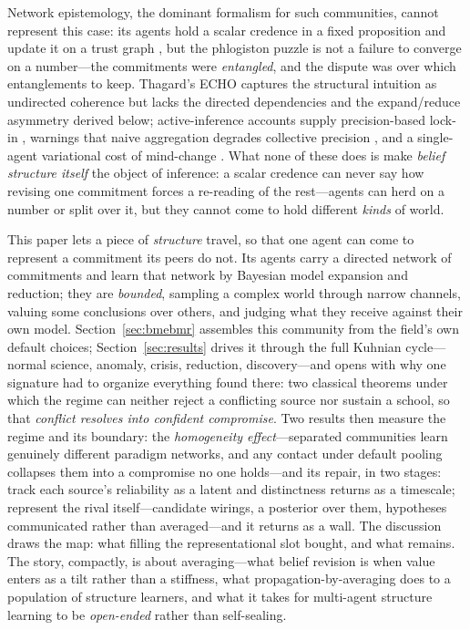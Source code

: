 \documentclass[runningheads]{llncs}
\begin{document}
Network epistemology, the dominant formalism for such communities, cannot represent this case:
its agents hold a scalar credence in a fixed proposition and update it on a trust graph
\citep{zollman2010,oconnor2019,zollman2013,jonard2025,michelini2023}, but the phlogiston puzzle
is not a failure to converge on a number---the commitments were \emph{entangled}, and the
dispute was over which entanglements to keep. Thagard's ECHO \citep{thagard1989,thagard1990}
captures the structural intuition as undirected coherence but lacks the directed dependencies
and the expand/reduce asymmetry derived below; active-inference accounts supply precision-based
lock-in \citep{albarracin2022}, warnings that naive aggregation degrades collective precision
\citep{friston2023federated,waade2025}, and a single-agent variational cost of mind-change
\citep{hyland2025}. What none of these does is make \emph{belief structure itself} the object
of inference: a scalar credence can never say how revising one commitment forces a re-reading
of the rest---agents can herd on a number or split over it, but they cannot come to hold
different \emph{kinds} of world.

This paper lets a piece of \emph{structure} travel, so that one agent can come to represent a
commitment its peers do not. Its agents carry a directed network of commitments and learn that
network by Bayesian model expansion and reduction; they are \emph{bounded}, sampling a complex
world through narrow channels, valuing some conclusions over others, and judging what they
receive against their own model. Section~\ref{sec:bmebmr} assembles this community from the
field's own default choices; Section~\ref{sec:results} drives it through the full Kuhnian
cycle---normal science, anomaly, crisis, reduction, discovery---and opens with why one signature
had to organize everything found there: two classical theorems under which the regime can neither
reject a conflicting source nor sustain a school, so that \emph{conflict resolves into confident
compromise}. Two results then measure the regime and its boundary: the \emph{homogeneity
effect}---separated communities learn genuinely different paradigm networks, and any contact
under default pooling collapses them into a compromise no one holds---and its repair, in two
stages: track each source's reliability as a latent and distinctness returns as a timescale;
represent the rival itself---candidate wirings, a posterior over them, hypotheses communicated
rather than averaged---and it returns as a wall. The discussion draws the map: what filling
the representational slot bought, and what remains.
The story, compactly, is about averaging---what belief revision is when value enters as a tilt
rather than a stiffness, what propagation-by-averaging does to a population of structure
learners, and what it takes for multi-agent structure learning to be \emph{open-ended} rather
than self-sealing.
\end{document}
